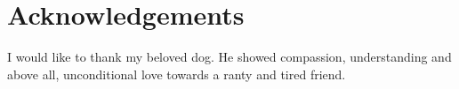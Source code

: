 
\chapter*{Acknowledgements}

I would like to thank my beloved dog. He showed compassion, understanding and above all, unconditional love towards a ranty and tired friend.

\vspace{10mm}
